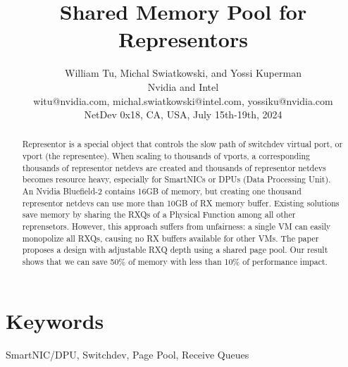 \documentclass[letterpaper]{article}
\title{Shared Memory Pool for Representors}
\author{William Tu, Michal Swiatkowski, and Yossi Kuperman\\
Nvidia and Intel\\
witu@nvidia.com, michal.swiatkowski@intel.com, yossiku@nvidia.com\\
\newline
NetDev 0x18, CA, USA, July 15th-19th, 2024
\newline
}
\begin{document}
 
\maketitle

\begin{abstract}
Representor is a special object that controls the slow path of
switchdev virtual port, or vport (the representee). 
When scaling to thousands of vports,
a corresponding thousands of
representor netdevs are created
and thousands of representor netdevs becomes resource heavy,
especially for SmartNICs or DPUs (Data Processing Unit).
An Nvidia Bluefield-2 contains 16GB of memory, but creating one
thousand representor netdevs can use more than 10GB of RX memory buffer.
Existing solutions save memory by sharing the RXQs of a Physical Function among
all other reprensetors. However, this approach suffers from unfairness:
a single VM can easily monopolize all RXQs, causing no RX buffers
available for other VMs.
The paper proposes a design with adjustable RXQ depth using a shared page pool.
Our result shows that we can save 50\% of memory with less than 10\% of
performance impact.
\end{abstract}

\section{Keywords}
SmartNIC/DPU, Switchdev, Page Pool, Receive Queues

\end{document}
